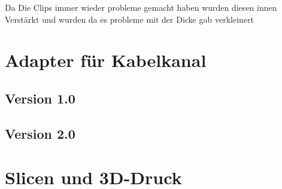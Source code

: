 \begin{inhalt}
Da Die Clips immer wieder probleme gemacht haben wurden diesen innen Verstärkt und wurden da es probleme mit der Dicke gab verkleinert 


\section{Adapter für Kabelkanal}

\subsection{Version 1.0}

\subsection{Version 2.0}

\section{Slicen und 3D-Druck}











\end{inhalt}